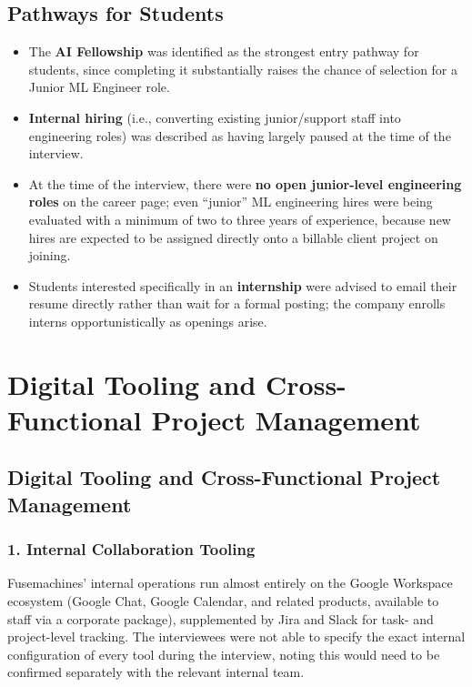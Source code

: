 \documentclass[12pt,a4paper]{report}
\begin{document}
\section{Pathways for Students}
\begin{itemize}[leftmargin=1.5cm]
  \item The \textbf{AI Fellowship} was identified as the strongest entry pathway for students, since completing it substantially raises the chance of selection for a Junior ML Engineer role.
  \item \textbf{Internal hiring} (i.e., converting existing junior/support staff into engineering roles) was described as having largely paused at the time of the interview.
  \item At the time of the interview, there were \textbf{no open junior-level engineering roles} on the career page; even ``junior'' ML engineering hires were being evaluated with a minimum of two to three years of experience, because new hires are expected to be assigned directly onto a billable client project on joining.
  \item Students interested specifically in an \textbf{internship} were advised to email their resume directly rather than wait for a formal posting; the company enrolls interns opportunistically as openings arise.
\end{itemize}

\chapter{Digital Tooling and Cross-Functional Project Management}

\section{Digital Tooling and Cross-Functional Project Management}

\subsection*{1. Internal Collaboration Tooling}
Fusemachines' internal operations run almost entirely on the Google Workspace ecosystem (Google Chat, Google Calendar, and related products, available to staff via a corporate package), supplemented by Jira and Slack for task- and project-level tracking. The interviewees were not able to specify the exact internal configuration of every tool during the interview, noting this would need to be confirmed separately with the relevant internal team.
\end{document}
